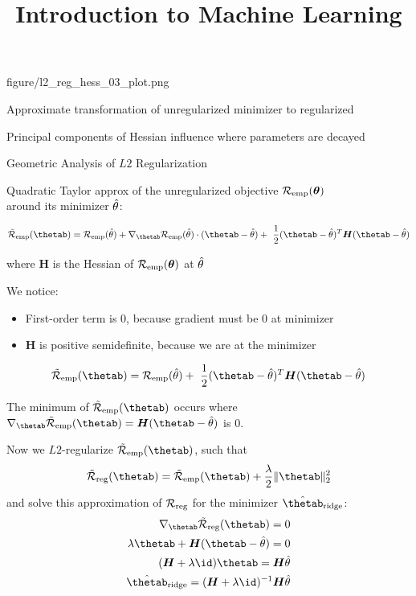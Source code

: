 \documentclass[11pt,compress,t,notes=noshow, xcolor=table]{beamer}
\title{Introduction to Machine Learning}
\begin{document}
{figure/l2_reg_hess_03_plot.png} {
  \item Approximate transformation of unregularized minimizer to regularized 
  \item Principal components of Hessian influence where parameters are decayed  
}

\begin{vbframe}{Geometric Analysis of $L2$ Regularization}

Quadratic Taylor approx of the unregularized objective $\mathcal{R}_{\text{emp}}(\bm{\theta})$ \\
around its minimizer $\hat{\theta}$:

$$ \mathcal{\tilde R}_{\text{emp}}(\thetab)= \mathcal{R}_{\text{emp}}(\thetah) + \nabla_{\thetab} \mathcal{R}_{\text{emp}}(\thetah)\cdot(\thetab - \thetah) + \ \frac{1}{2} (\thetab - \thetah)^T \bm{H} (\thetab - \thetah) $$

where $\bm{H}$ is the Hessian of $\mathcal{R}_{\text{emp}}(\bm{\theta})$ at $\hat{\theta}$

\lz \lz 

We notice:

\begin{itemize}
  \item First-order term is 0, because gradient must be $0$ at minimizer
  \item $\bm{H}$ is positive semidefinite, because we are at the minimizer
\end{itemize}


$$ \mathcal{\tilde R}_{\text{emp}}(\thetab)= \mathcal{R}_{\text{emp}}(\thetah) + \ \frac{1}{2} (\thetab - \thetah)^T \bm{H} (\thetab - \thetah) $$


\lz

\framebreak

\normalsize

The minimum of $\mathcal{\tilde R}_{\text{emp}}(\thetab)$ occurs where $\nabla_{\thetab}\mathcal{\tilde R}_{\text{emp}}(\thetab) = \bm{H}(\thetab - \thetah)$ is $0$.

Now we $L2$-regularize $\mathcal{\tilde R}_{\text{emp}}(\thetab)$, such that 
\[
\mathcal{\tilde R}_{\text{reg}}(\thetab) = \mathcal{\tilde R}_{\text{emp}}(\thetab) + \frac{\lambda}{2} \|\thetab\|^2_2\]
and solve this approximation of $\mathcal{R}_{\text{reg}}$ for the minimizer $\hat{\thetab}_{\text{ridge}}$:
\begin{align*}
 \nabla_{\thetab}\mathcal{\tilde R}_{\text{reg}}(\thetab) = 0\\
  \lambda \thetab + \bm{H}(\thetab - \thetah) = 0\\
      (\bm{H} + \lambda \id) \thetab = \bm{H} \thetah\\
      \hat{\thetab}_{\text{ridge}} = (\bm{H} + \lambda \id)^{-1}\bm{H} \thetah
\end{align*}


\end{vbframe}
\end{document}
